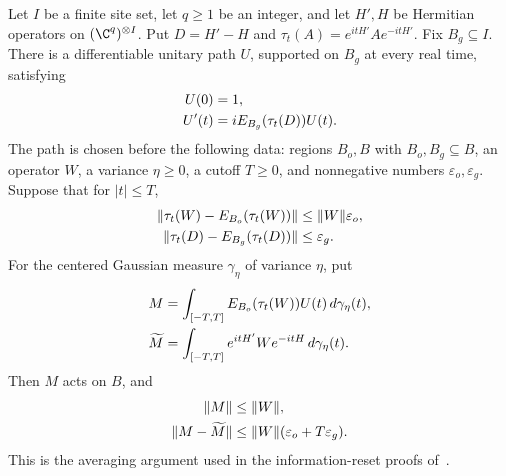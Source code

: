 \begin{lemma}
    \label{thm:qc_supported_gaussian_projection_bounds}
    \leanok
    Let $I$ be a finite site set, let $q\ge1$ be an integer, and let $H',H$
    be Hermitian operators on $(\C^q)^{\otimes I}$.
    Put $D=H'-H$ and $\tau_t(A)=e^{itH'}Ae^{-itH'}$.
    Fix $B_g\subseteq I$. There is a differentiable unitary path $U$, supported
    on $B_g$ at every real time, satisfying
    \begin{align}
        U(0)  & =1,\notag                       \\
        U'(t) & =iE_{B_g}(\tau_t(D))U(t).\notag
    \end{align}
    The path is chosen before the following data: regions $B_o,B$ with
    $B_o,B_g\subseteq B$, an operator $W$, a variance $\eta\ge0$, a cutoff
    $T\ge0$, and nonnegative numbers $\varepsilon_o,\varepsilon_g$.
    Suppose that for $|t|\le T$,
    \begin{align}
        \|\tau_t(W)-E_{B_o}(\tau_t(W))\| & \le\|W\|\varepsilon_o,\notag \\
        \|\tau_t(D)-E_{B_g}(\tau_t(D))\| & \le\varepsilon_g.\notag
    \end{align}
    For the centered Gaussian measure $\gamma_\eta$ of variance $\eta$, put
    \begin{align}
        M            & =\int_{[-T,T]}E_{B_o}(\tau_t(W))U(t)\,d\gamma_\eta(t),\notag \\
        \widetilde M & =\int_{[-T,T]}e^{itH'}We^{-itH}\,d\gamma_\eta(t).\notag
    \end{align}
    Then $M$ acts on $B$, and
    \begin{align}
        \|M\|              & \le\|W\|,\notag                         \\
        \|M-\widetilde M\| & \le\|W\|(\varepsilon_o+T\varepsilon_g).
        \label{eq:qc_gaussian_projection_error}
    \end{align}
    This is the averaging argument used in the information-reset proofs
    of~\cite{OpenAI2026PolynomialPEPS,TNLean2026OneDimensional}.
\end{lemma}
